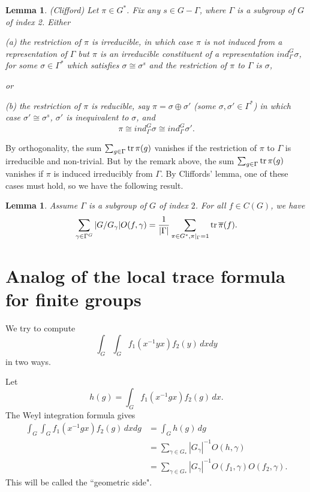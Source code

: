\documentclass[12pt]{article}
\newtheorem{lemma}[theorem]{Lemma}
\begin{document}
\begin{lemma} (Clifford) Let $\pi\in G^*$. Fix any $s\in G-\Gamma $,
where $\Gamma $ is a subgroup of $G$ of index 2. Either

(a) the restriction of $\pi$ is irreducible, in which case $\pi$
is not induced from a representation of $\Gamma $ but
$\pi$ is an irreducible constituent of a representation 
$ind_\Gamma ^G\sigma$, for some $\sigma\in \Gamma ^*$ which satisfies 
$\sigma\cong \sigma^s$ and the restriction of $\pi$ to $\Gamma $
is $\sigma$, 

or

(b) the restriction of $\pi$ is reducible, say $\pi=\sigma \oplus \sigma'$
(some $\sigma,\sigma'\in \Gamma ^*$) in which case $\sigma'\cong\sigma^s$,
$\sigma'$ is inequivalent to $\sigma$, and
\[
\pi\cong ind_\Gamma ^G\sigma \cong ind_\Gamma ^G\sigma' .
\]
\end{lemma}

By orthogonality, the sum $\sum_{g\in \Gamma } {\rm tr}\,\pi(g)$
vanishes if the restriction of $\pi$ to $\Gamma $ is irreducible and non-trivial.
But by the remark above, the sum $\sum_{g\in \Gamma } {\rm tr}\,\pi(g)$
vanishes if $\pi$ is induced irreducibly from $\Gamma $. By Cliffords' lemma,
one of these cases must hold, so we have the following result.

\begin{lemma} Assume $\Gamma $ is a subgroup of $G$ of index $2$.
For all $f\in C(G)$, we have
\[
\sum_{\gamma\in \Gamma ^G} |G/G_\gamma|O(f,\gamma)
={1\over |\Gamma |}\sum_{\pi\in G^*, \pi|_{\Gamma }=1} {\rm tr}\,\overline{\pi}(f).
\]
\end{lemma}

\section{Analog of the local trace formula for finite groups}

We try to compute 
\[
\int_G \int_G f_1(x^{-1}yx)f_2(y)\, dxdy
\]
in two ways.

Let
\[
h(g) = \int_G f_1(x^{-1}gx)f_2(g)\, dx.
\]
The Weyl integration formula gives 
\[
\begin{split}
\int_G \int_G f_1(x^{-1}gx)f_2(g)\, dxdg
&=\int_G h(g)\, dg\\
&=\sum_{\gamma\in G_*} |G_\gamma|^{-1} O(h,\gamma)\\
&=\sum_{\gamma\in G_*} |G_\gamma|^{-1} O(f_1,\gamma)O(f_2,\gamma).
\end{split}
\]
This will be called the ``geometric side".
\end{document}
